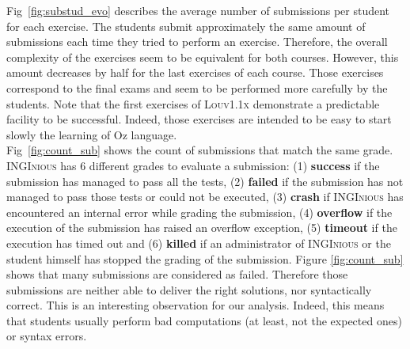 \documentclass[11pt,a4paper,twoside,openright]{report}
\begin{document}
Fig~\ref{fig:substud_evo} describes the average number of submissions per 
student for each exercise. The students submit approximately the same amount of 
submissions each time they tried to perform an exercise. Therefore, the overall 
complexity of the exercises seem to be equivalent for both courses. However, 
this 
amount decreases by half for the last exercises of each course. Those exercises 
correspond to the final exams and seem to be performed more carefully by the 
students. Note that the first exercises of \textsc{Louv1.1x} demonstrate a 
predictable facility to be successful. Indeed, those exercises are intended to 
be easy to start slowly the learning of Oz language.\\

Fig~\ref{fig:count_sub} shows the count of submissions that match the same 
grade. \textsc{INGInious} has 6 different grades to evaluate a 
submission: (1) \textbf{success} if the submission has managed to pass all the 
tests, (2) \textbf{failed} if the submission has not managed to pass those tests 
or could not be executed, (3) \textbf{crash} if \textsc{INGInious} has encountered 
an internal error while grading the submission, (4) \textbf{overflow} if the 
execution of the submission has raised an overflow exception, (5) 
\textbf{timeout} if the execution has timed out and (6) \textbf{killed} if an 
administrator of \textsc{INGInious} or the student himself has stopped the grading 
of the submission. Figure \ref{fig:count_sub} shows that many submissions are considered as 
failed. Therefore those submissions are neither able to deliver the right 
solutions, nor syntactically correct. This is an interesting observation 
for our analysis. Indeed, this means that students usually perform bad 
computations (at least, not the expected ones) or syntax errors.\\
\end{document}
